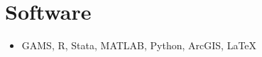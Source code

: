 \documentclass{article}[12]
\begin{document}



\section{Software}

\begin{itemize}[itemsep=0.5em]
    \item GAMS, R, Stata, MATLAB, Python, ArcGIS, \LaTeX
\end{itemize}


\thispagestyle{laststyle}
\end{document}
